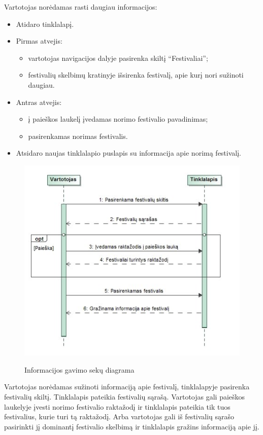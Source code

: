 \documentclass{VUMIFPSkursinis}
\begin{document}
Vartotojas norėdamas rasti daugiau informacijos:
\begin{itemize}
\item Atidaro tinklalapį.
\item Pirmas atvejis:
\begin{itemize}
\item vartotojas navigacijos dalyje pasirenka skiltį “Festivaliai”;
\item festivalių skelbimų kratinyje išsirenka festivalį, apie kurį nori sužinoti daugiau.
\end{itemize}
\item Antras atvejis:
\begin{itemize}
\item į paieškos laukelį įvedamas norimo festivalio pavadinimas;
\item pasirenkamas norimas festivalis.
\end{itemize}
\item Atsidaro naujas tinklalapio puslapis su informacija apie norimą festivalį.
\end{itemize}

\begin{figure}[H]
    \centering
    \includegraphics[scale=0.7]{img/geri/_klientasInfo}
    \label{img:uml4}
	\caption{Informacijos gavimo sekų diagrama}
\end{figure}

Vartotojas norėdamas sužinoti informaciją apie festivalį, tinklalapyje pasirenka festivalių skiltį. Tinklalapis pateikia festivalių sąrašą. Vartotojas gali paieškos laukelyje įvesti norimo festivalio raktažodį ir tinklalapis pateikia tik tuos festivalius, kurie turi tą raktažodį. Arba vartotojas gali iš festivalių sąrašo pasirinkti jį dominantį festivalio skelbimą ir tinklalapis gražins informaciją apie jį.
\end{document}
